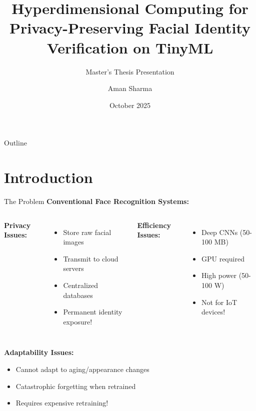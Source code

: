 \documentclass[aspectratio=169]{beamer}
\title{Hyperdimensional Computing for Privacy-Preserving Facial Identity Verification on TinyML}
\subtitle{Master's Thesis Presentation}
\author{Aman Sharma}
\institute{
  Department of Electrical Engineering\\
  San José State University
}
\date{October 2025}
\begin{document}
\frame{\titlepage}

\begin{frame}{Outline}
\tableofcontents
\end{frame}

\section{Introduction}

\begin{frame}{The Problem}
\textbf{Conventional Face Recognition Systems:}

\begin{columns}
\textbf{Privacy Issues:}
\begin{itemize}
    \item Store raw facial images
    \item Transmit to cloud servers
    \item Centralized databases
    \item \alert{Permanent identity exposure!}
\end{itemize}

\textbf{Efficiency Issues:}
\begin{itemize}
    \item Deep CNNs (50-100 MB)
    \item GPU required
    \item High power (50-100 W)
    \item \alert{Not for IoT devices!}
\end{itemize}
\end{columns}

\vspace{1em}
\textbf{Adaptability Issues:}
\begin{itemize}
    \item Cannot adapt to aging/appearance changes
    \item Catastrophic forgetting when retrained
    \item \alert{Requires expensive retraining!}
\end{itemize}
\end{frame}
\end{document}
